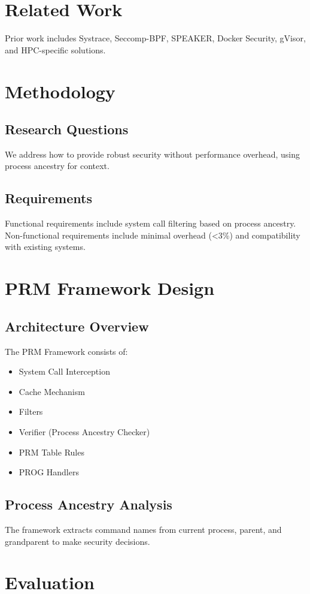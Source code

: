 \documentclass{article}
\begin{document}
\section{Related Work}
Prior work includes Systrace, Seccomp-BPF, SPEAKER, Docker Security, gVisor, and HPC-specific solutions.

\section{Methodology}
\subsection{Research Questions}
We address how to provide robust security without performance overhead, using process ancestry for context.

\subsection{Requirements}
Functional requirements include system call filtering based on process ancestry. Non-functional requirements include minimal overhead (<3\%) and compatibility with existing systems.

\section{PRM Framework Design}
\subsection{Architecture Overview}
The PRM Framework consists of:
\begin{itemize}
\item System Call Interception
\item Cache Mechanism
\item Filters
\item Verifier (Process Ancestry Checker)
\item PRM Table Rules
\item PROG Handlers
\end{itemize}

\subsection{Process Ancestry Analysis}
The framework extracts command names from current process, parent, and grandparent to make security decisions.

\section{Evaluation}
\end{document}
